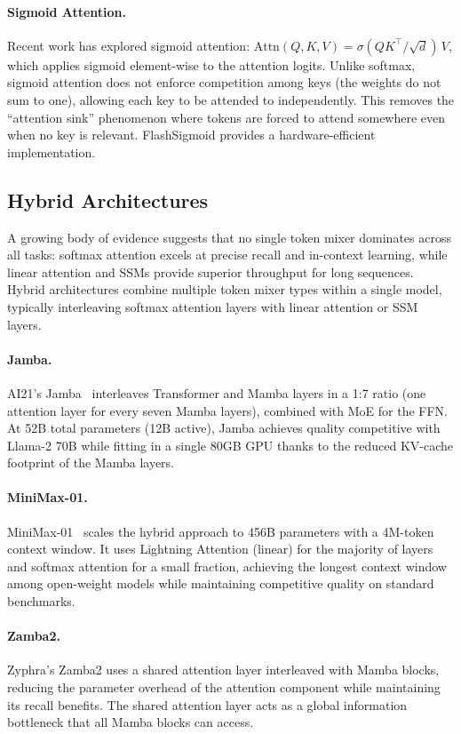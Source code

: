 \paragraph{Sigmoid Attention.}
Recent work has explored sigmoid attention: $\text{Attn}(Q, K, V) = \sigma(QK^\top / \sqrt{d})\, V$, which applies sigmoid element-wise to the attention logits. Unlike softmax, sigmoid attention does not enforce competition among keys (the weights do not sum to one), allowing each key to be attended to independently. This removes the ``attention sink'' phenomenon where tokens are forced to attend somewhere even when no key is relevant. FlashSigmoid provides a hardware-efficient implementation.

\subsection{Hybrid Architectures}
\label{subsec:hybrid}

A growing body of evidence suggests that no single token mixer dominates across all tasks: softmax attention excels at precise recall and in-context learning, while linear attention and SSMs provide superior throughput for long sequences. Hybrid architectures combine multiple token mixer types within a single model, typically interleaving softmax attention layers with linear attention or SSM layers.

\paragraph{Jamba.}
AI21's Jamba~\cite{lieber2024jamba_tr} interleaves Transformer and Mamba layers in a 1:7 ratio (one attention layer for every seven Mamba layers), combined with MoE for the FFN. At 52B total parameters (12B active), Jamba achieves quality competitive with Llama-2 70B while fitting in a single 80GB GPU thanks to the reduced KV-cache footprint of the Mamba layers.

\paragraph{MiniMax-01.}
MiniMax-01~\cite{minimax2025} scales the hybrid approach to 456B parameters with a 4M-token context window. It uses Lightning Attention (linear) for the majority of layers and softmax attention for a small fraction, achieving the longest context window among open-weight models while maintaining competitive quality on standard benchmarks.

\paragraph{Zamba2.}
Zyphra's Zamba2 uses a shared attention layer interleaved with Mamba blocks, reducing the parameter overhead of the attention component while maintaining its recall benefits. The shared attention layer acts as a global information bottleneck that all Mamba blocks can access.

